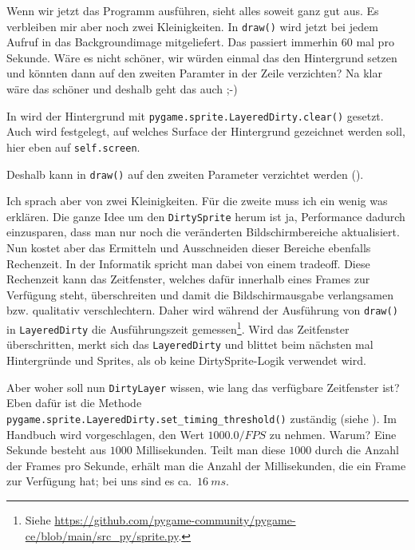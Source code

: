 

Wenn wir jetzt das Programm ausführen, sieht alles soweit ganz gut aus. Es verbleiben mir aber noch zwei Kleinigkeiten. In \texttt{draw()} wird jetzt bei jedem Aufruf in  das Backgroundimage mitgeliefert. Das passiert immerhin 60 mal pro Sekunde. Wäre es nicht schöner, wir würden einmal das den Hintergrund setzen und könnten dann auf den zweiten Paramter in der Zeile verzichten? Na klar wäre das schöner und deshalb geht das auch ;-)

In  wird der Hintergrund mit \texttt{pygame.sprite.LayeredDirty.clear()} gesetzt. Auch wird festgelegt, auf welches Surface der Hintergrund gezeichnet werden soll, hier eben auf \texttt{self.screen}.


Deshalb kann in \texttt{draw()} auf den zweiten Parameter verzichtet werden ().

\newpage
{} 

Ich sprach aber von zwei Kleinigkeiten. Für die zweite muss ich ein wenig was erklären. Die ganze Idee um den \texttt{DirtySprite} herum ist ja, Performance dadurch einzusparen, dass man nur noch die veränderten Bildschirmbereiche aktualisiert. Nun kostet aber das Ermitteln und Ausschneiden dieser Bereiche ebenfalls Rechenzeit. In der Informatik spricht man dabei von einem \gls{tradeoff}. Diese Rechenzeit kann das Zeitfenster, welches dafür innerhalb eines Frames zur Verfügung steht, überschreiten und damit die Bildschirmausgabe verlangsamen bzw. qualitativ verschlechtern. Daher wird während der Ausführung von \texttt{draw()} in \texttt{LayeredDirty} die Ausführungszeit gemessen\footnote{Siehe \url{https://github.com/pygame-community/pygame-ce/blob/main/src_py/sprite.py}.}. Wird das Zeitfenster überschritten, merkt sich das \texttt{LayeredDirty} und blittet beim nächsten mal Hintergründe und Sprites, als ob keine DirtySprite-Logik verwendet wird. 

Aber woher soll nun \texttt{DirtyLayer} wissen, wie lang das verfügbare Zeitfenster ist? Eben dafür ist die Methode \texttt{pygame.sprite.LayeredDirty.set\-\_tim\-ing\-\_thres\-hold()} zuständig (siehe ). Im Handbuch wird vorgeschlagen, den Wert $1000.0 / FPS$ zu nehmen. Warum? Eine Sekunde besteht aus $1000$ Millisekunden. Teilt man diese $1000$ durch die Anzahl der Frames pro Sekunde, erhält man die Anzahl der Millisekunden, die ein Frame zur Verfügung hat; bei uns sind es ca.~$16~ms$.

